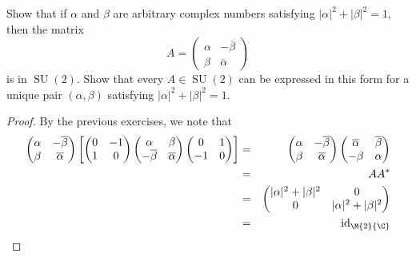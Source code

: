 \documentclass[10pt]{amsart}
\begin{document}
\begin{ex}
  Show that if $\alpha$ and $\beta$ are arbitrary complex numbers satisfying $|\alpha|^2 + |\beta|^2 = 1$, then the matrix
  $$A = \left(\begin{matrix}
    \alpha & -\overline{\beta}\\
    \beta & \overline{\alpha}
  \end{matrix}\right)$$
  is in $\operatorname{SU}(2)$.
  Show that every $A \in \operatorname{SU}(2)$ can be expressed in this form for a unique pair $(\alpha, \beta)$ satisfying $|\alpha|^2 + |\beta|^2 = 1$.
  \begin{proof}
    By the previous exercises, we note that
    \begin{eqnarray*}
    \left(\begin{matrix}
      \alpha & -\overline{\beta}\\
      \beta & \overline{\alpha}
    \end{matrix}\right)
    \left[
    \left(\begin{matrix}
      0 & -1\\
      1 & 0
    \end{matrix}\right)
    \left(\begin{matrix}
      \alpha & \beta\\
      -\overline{\beta} & \overline{\alpha}
    \end{matrix}\right)
    \left(\begin{matrix}
      0 & 1\\
      -1 & 0
    \end{matrix}\right)\right]
    &=&
    \left(\begin{matrix}
      \alpha & -\overline{\beta}\\
      \beta & \overline{\alpha}
    \end{matrix}\right)
    \left(\begin{matrix}
      \overline{\alpha} & \overline{\beta}\\
      -\beta & \alpha
    \end{matrix}\right)\\
    &=&
    AA^*\\
    &=&
    \left(\begin{matrix}
      |\alpha|^2 + |\beta|^2 & 0\\
      0 & |\alpha|^2 + |\beta|^2
    \end{matrix}\right)\\
    &=& \operatorname{id}_{\M{2}{\C}}
    \end{eqnarray*}

\end{proof}
\end{ex}
\end{document}
